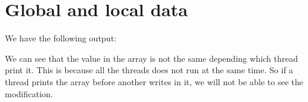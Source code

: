 \chapter{Global and local data}

We have the following output:


We can see that the value in the array is not the same depending which thread print it. This is because all the threads does not run at the same time. So if a thread prints the array before another writes in it, we will not be able to see the modification.

